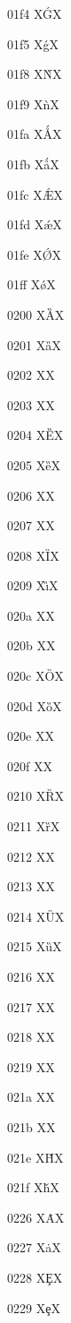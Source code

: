 \documentclass[11pt]{article}
\begin{document}
01f4 X{\'G}X

01f5 X{\'g}X

01f8 X{\`N}X

01f9 X{\`n}X

01fa X{\'{\AA}}X

01fb X{\'{\aa}}X

01fc X{\'{\AE}}X

01fd X{\'{\ae}}X

01fe X{\'{\O}}X

01ff X{\'{\o}}X

0200 X{\G{A}}X

0201 X{\G{a}}X

0202 X{}X

0203 X{}X

0204 X{\G{E}}X

0205 X{\G{e}}X

0206 X{}X

0207 X{}X

0208 X{\G{I}}X

0209 X{\G{\i}}X

020a X{}X

020b X{\textroundcap{\i}}X

020c X{\G{O}}X

020d X{\G{o}}X

020e X{}X

020f X{}X

0210 X{\G{R}}X

0211 X{\G{r}}X

0212 X{}X

0213 X{}X

0214 X{\G{U}}X

0215 X{\G{u}}X

0216 X{}X

0217 X{}X

0218 X{}X

0219 X{}X

021a X{}X

021b X{}X

021e X{\v{H}}X

021f X{\v{h}}X

0226 X{\.A}X

0227 X{\.a}X

0228 X{\c{E}}X

0229 X{\c{e}}X
\end{document}
